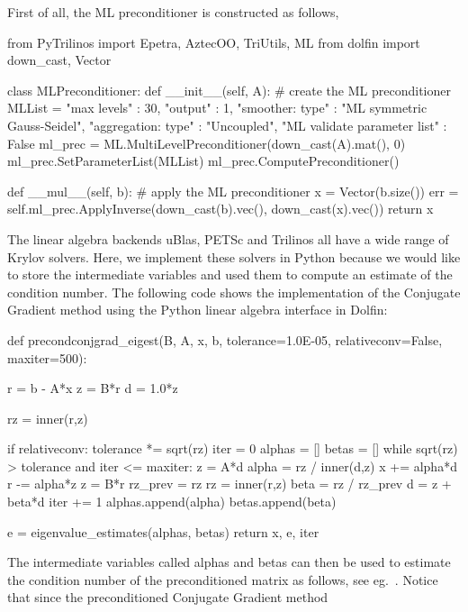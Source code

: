 First of all, the ML preconditioner is constructed as follows,  
\begin{python}
from PyTrilinos import Epetra, AztecOO, TriUtils, ML 
from dolfin import down_cast, Vector 

class MLPreconditioner: 
    def __init__(self, A): 
        # create the ML preconditioner
        MLList = {
              "max levels"        : 30, 
              "output"            : 1,  
              "smoother: type"    : "ML symmetric Gauss-Seidel",
              "aggregation: type" : "Uncoupled",
              "ML validate parameter list" : False
        }
        ml_prec = ML.MultiLevelPreconditioner(down_cast(A).mat(), 0)
        ml_prec.SetParameterList(MLList)
        ml_prec.ComputePreconditioner()

    def __mul__(self, b):
        # apply the ML preconditioner
        x = Vector(b.size())
        err = self.ml_prec.ApplyInverse(down_cast(b).vec(),
                                        down_cast(x).vec())
        return x
\end{python}
The linear algebra backends uBlas, PETSc and Trilinos all have 
a wide range of Krylov solvers. Here, we implement
these solvers in Python because we would like to store the intermediate
variables and  used them to compute an estimate of the condition number. 
The following code shows the implementation of the Conjugate Gradient method
using the Python linear algebra interface in Dolfin:
\begin{python}
def precondconjgrad_eigest(B, A, x, b, tolerance=1.0E-05, 
                           relativeconv=False, maxiter=500):

    r = b - A*x
    z = B*r
    d = 1.0*z

    rz = inner(r,z)

    if relativeconv: tolerance *= sqrt(rz)
    iter = 0
    alphas = []
    betas = []
    while sqrt(rz) > tolerance and iter <= maxiter:
        z = A*d
        alpha = rz / inner(d,z)
        x += alpha*d
        r -= alpha*z
        z = B*r
        rz_prev = rz
        rz = inner(r,z)
        beta =  rz / rz_prev
        d = z + beta*d
        iter += 1
        alphas.append(alpha)
        betas.append(beta)

    e = eigenvalue_estimates(alphas, betas)
    return x, e, iter
\end{python}
The intermediate variables called alphas and betas can then be used to estimate the condition number of
the preconditioned matrix as follows, see eg.~\cite{Saad2003}. 
Notice that since the preconditioned Conjugate Gradient method 

